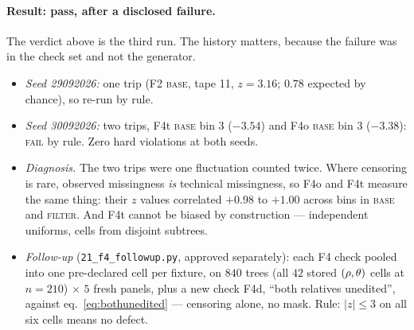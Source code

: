 \paragraph{Result: pass, after a disclosed failure.} The verdict above is the third run. The history
matters, because the failure was in the check set and not the generator.
\begin{itemize}
  \item \emph{Seed 29092026:} one trip (F2 \textsc{base}, tape 11, $z=3.16$; $0.78$ expected by
        chance), so re-run by rule.
  \item \emph{Seed 30092026:} two trips, F4t \textsc{base} bin 3 ($-3.54$) and F4o \textsc{base}
        bin 3 ($-3.38$): \textsc{fail} by rule. Zero hard violations at both seeds.
  \item \emph{Diagnosis.} The two trips were one fluctuation counted twice. Where censoring is rare,
        observed missingness \emph{is} technical missingness, so F4o and F4t measure the same thing:
        their $z$ values correlated $+0.98$ to $+1.00$ across bins in \textsc{base} and
        \textsc{filter}. And F4t cannot be biased by construction --- independent uniforms, cells
        from disjoint subtrees.
  \item \emph{Follow-up} (\texttt{21\_f4\_followup.py}, approved separately): each F4 check pooled
        into one pre-declared cell per fixture, on $840$ trees (all $42$ stored $(\rho,\theta)$ cells
        at $n=210$) $\times$ $5$ fresh panels, plus a new check F4d, ``both relatives unedited'',
        against eq.~\eqref{eq:bothunedited} --- censoring alone, no mask. Rule: $|z|\le3$ on all six
        cells means no defect.
\end{itemize}

